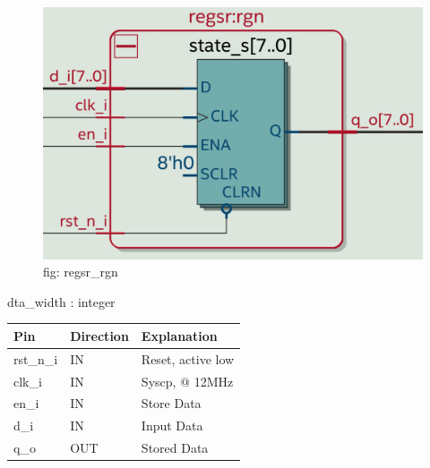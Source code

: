 \documentclass[12pt,a4 paper] {report}
\begin{document}
\begin{figure}[h]
	\centering	
	\includegraphics[scale=0.2]{../png/regsr_rgn.png}
	\newline
	fig: regsr\_rgn\\
\end{figure}
dta\_width : integer\\
\begin{center}
	\begin{tabular}{| p{2cm} | p{2cm} | p{4cm} |}
		\hline
		Pin & Direction  & Explanation\\
		\hline	
 		 rst\_n\_i & IN &   Reset, active low\\
 		 \hline
		clk\_i   & IN  &      Syscp, @ 12MHz\\
		\hline
		en\_i    & IN  &   Store Data\\
		\hline
		d\_i     & IN  & Input Data\\
		\hline
		q\_o     & OUT & Stored Data\\
		\hline
		
	\end{tabular}
\end{center}



\newpage
\end{document}
